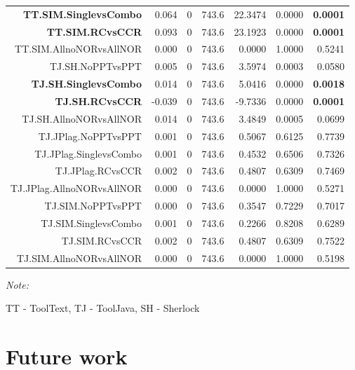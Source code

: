 \documentclass[a4paper, 12pt, oneside, openany, final, pdftex]{book}\usepackage[]{graphicx}\usepackage[]{color}
\begin{document}
\begin{table}
\begin{threeparttable}
\begin{tabular}{rrrrrrr}
\textbf{TT.SIM.SinglevsCombo} & 0.064 & 0 & 743.6 & 22.3474 & 0.0000 & \textbf{0.0001}\\
\rowcolor{gray!6}  \textbf{TT.SIM.RCvsCCR} & 0.093 & 0 & 743.6 & 23.1923 & 0.0000 & \textbf{0.0001}\\
TT.SIM.AllnoNORvsAllNOR & 0.000 & 0 & 743.6 & 0.0000 & 1.0000 & 0.5241\\
\rowcolor{gray!6}  TJ.SH.NoPPTvsPPT & 0.005 & 0 & 743.6 & 3.5974 & 0.0003 & 0.0580\\
\textbf{TJ.SH.SinglevsCombo} & 0.014 & 0 & 743.6 & 5.0416 & 0.0000 & \textbf{0.0018}\\
\rowcolor{gray!6}  \textbf{TJ.SH.RCvsCCR} & -0.039 & 0 & 743.6 & -9.7336 & 0.0000 & \textbf{0.0001}\\
TJ.SH.AllnoNORvsAllNOR & 0.014 & 0 & 743.6 & 3.4849 & 0.0005 & 0.0699\\
\rowcolor{gray!6}  TJ.JPlag.NoPPTvsPPT & 0.001 & 0 & 743.6 & 0.5067 & 0.6125 & 0.7739\\
TJ.JPlag.SinglevsCombo & 0.001 & 0 & 743.6 & 0.4532 & 0.6506 & 0.7326\\
\rowcolor{gray!6}  TJ.JPlag.RCvsCCR & 0.002 & 0 & 743.6 & 0.4807 & 0.6309 & 0.7469\\
TJ.JPlag.AllnoNORvsAllNOR & 0.000 & 0 & 743.6 & 0.0000 & 1.0000 & 0.5271\\
\rowcolor{gray!6}  TJ.SIM.NoPPTvsPPT & 0.000 & 0 & 743.6 & 0.3547 & 0.7229 & 0.7017\\
TJ.SIM.SinglevsCombo & 0.001 & 0 & 743.6 & 0.2266 & 0.8208 & 0.6289\\
\rowcolor{gray!6}  TJ.SIM.RCvsCCR & 0.002 & 0 & 743.6 & 0.4807 & 0.6309 & 0.7522\\
TJ.SIM.AllnoNORvsAllNOR & 0.000 & 0 & 743.6 & 0.0000 & 1.0000 & 0.5198\\
\bottomrule
\end{tabular}
\begin{tablenotes}
\item \textit{Note: } 
\item TT - ToolText, TJ - ToolJava, SH - Sherlock
\end{tablenotes}
\end{threeparttable}


\end{table}

\chapter{Future work}\label{ch:futureWork}

\end{document}
